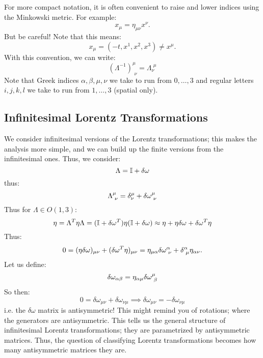 For more compact notation, it is often convenient to raise and lower indices using the Minkowski metric. For example:
\begin{equation}
    x_\mu = \eta_{\mu\nu}x^\nu.
\end{equation}
But be careful! Note that this means:
\begin{equation}
    x_\mu = (-t, x^1, x^2, x^3) \neq x^\mu.
\end{equation}
With this convention, we can write:
\begin{equation}
    (\Lambda^{-1})^{\mu}_{\phantom{i}\nu} = \Lambda_\nu^{\phantom{i}\mu}
\end{equation}
Note that Greek indices $\alpha, \beta, \mu, \nu$ we take to run from $0, \ldots, 3$ and regular letters $i, j, k, l$ we take to run from $1, \ldots, 3$ (spatial only).

\subsection{Infinitesimal Lorentz Transformations}
We consider infinitesimal versions of the Lorentz transformations; this makes the analysis more simple, and we can build up the finite versions from the infinitesimal ones. Thus, we consider:
\begin{equation}
    \Lambda = \mathbb{I} + \delta \omega
\end{equation}
thus:
\begin{equation}
    \Lambda^\mu_{\sp\nu} = \delta_\nu^\mu + \delta\omega^\mu_{\sp\nu}
\end{equation}
Thus for $\Lambda \in O(1, 3)$:
\begin{equation}
    \eta = \Lambda^T \eta \Lambda = (\mathbb{I} + \delta\omega^T)\eta(\mathbb{I} + \delta\omega) \approx \eta + \eta\delta\omega + \delta\omega^T \eta
\end{equation}
Thus:
\begin{equation}
    0 = (\eta\delta\omega)_{\mu\nu} + (\delta\omega^T\eta)_{\mu\nu} = \eta_{\mu\alpha}\delta\omega^\alpha_{\sp\nu} + \delta^\alpha_{\sp\mu}\eta_{\alpha\nu}.
\end{equation}
Let us define:
\begin{equation}
    \delta\omega_{\alpha\beta} = \eta_{\alpha\mu}\delta\omega^\mu_{\sp\beta}
\end{equation}
So then:
\begin{equation}
    0 = \delta\omega_{\mu\nu} + \delta\omega_{\nu\mu} \implies \delta\omega_{\mu\nu} = -\delta\omega_{\nu\mu} 
\end{equation}
i.e. the $\delta\omega$ matrix is antisymmetric! This might remind you of rotations; where the generators are antisymmetric. This tells us the general structure of infinitesimal Lorentz transformations; they are parametrized by antisymmetric matrices. Thus, the question of classifying Lorentz transformations becomes how many antisymmetric matrices they are.

